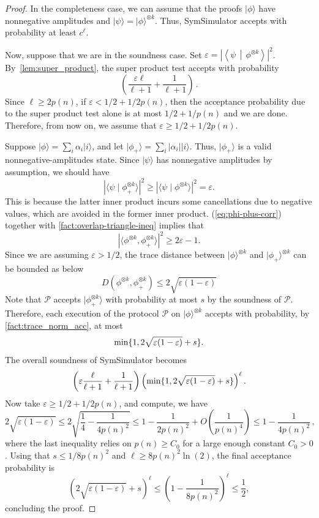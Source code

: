 \documentclass[10pt,a4paper]{article}
\theoremstyle{remark}
\def\epsilon{\varepsilon}
\def\cal{\mathcal}
\newcommand{\mper}{\,.}
\newcommand{\mcom}{\,,}
\newcommand{\abs}[1]{\ensuremath{\left\lvert #1 \right\rvert}}
\newcommand{\calP}{{\cal P}}
\newcommand{\1}[1]{\mathds{1}{[#1]}}
\newcommand{\ket}[1]{\lvert #1\rangle}
\newcommand{\braket}[2]{\left\langle #1 \,\middle\vert\, #2\right\rangle}
\DeclarePairedDelimiter\set{\lbrace}{\rbrace}
\numberwithin{equation}{section}
\begin{document}
\begin{proof}
  In the completeness case, we can assume that the proofs $\ket{\phi}$ have nonnegative amplitudes
  and $\ket{\psi} = \ket{\phi}^{\otimes k}$. Thus, SymSimulator accepts with probability at least $c^\ell$.

  Now, suppose that we are in the soundness case. Set $\epsilon =\abs{\braket{\psi}{\phi^{\otimes k}}}^2$.
  By~\cref{lem:super_product}, the super product test accepts with probability
    \[ 
  \left( \frac{ \epsilon\ell}{\ell+1} + \frac{1}{\ell+1} \right)\mper
    \] 
      Since $\ell \ge 2p(n)$, if $\epsilon < 1/2 + 1/2p(n)$, then the acceptance probability due to the super product test alone is at most $1/2+1/p(n)$
  and we are done. Therefore, from now on, we assume that $\epsilon \ge 1/2 + 1/2p(n)$. 
  
  Suppose $\ket{\phi} = \sum_i \alpha_i \ket{i}$, and let $\ket{\phi_+} = \sum_{i} \abs{\alpha_i} \ket{i}$. Thus, $\ket{\phi_+}$ is a valid nonnegative-amplitudes state.
  Since $\ket{\psi}$ has nonnegative amplitudes by assumption, we should have 
    \begin{equation}\label{eq:phi-plus-corr}
        |\langle \psi \mid \phi_+^{\otimes k} \rangle|^2 \ge |\langle \psi \mid \phi^{\otimes k} \rangle|^2 = \epsilon.
    \end{equation}
  This is because the latter inner product incurs some cancellations due to negative values, which are avoided in the former inner product. 
  (\ref{eq:phi-plus-corr}) together with \cref{fact:overlap-triangle-ineq} implies that  
    \begin{equation*}
        |\langle \phi^{\otimes k}, \phi_+^{\otimes k}\rangle|^2
            \ge 2\epsilon-1.
    \end{equation*}
  Since we are assuming $\epsilon > 1/2$, the trace distance between $\ket\phi ^{\otimes k}$ and $\ket{\phi_+}^{\otimes k}$ can be bounded as below
    \begin{equation}
        D(\phi^{\otimes k}, \phi_+^{\otimes k})\le 2\sqrt{\epsilon(1-\epsilon)}
    \end{equation}
  Note that $\calP$ accepts $|\phi_+^{\otimes k}\rangle$ with probability at most $s$ by the soundness of $\calP$.
  Therefore, each execution of the protocol $\calP$ on $\ket\phi ^{\otimes k}$ accepts with probability, by \cref{fact:trace_norm_acc}, at most 
  \[\min\set{1,2\sqrt{\epsilon(1-\epsilon)} + s}.\]
  The overall soundness of SymSimulator becomes
    \[ 
  \left(\epsilon \frac{\ell}{\ell+1} + \frac{1}{\ell+1} \right) \left( \min\set{1,2\sqrt{\epsilon(1-\epsilon)} + s} \right)^{\ell} .
    \] 
 Now take  $\epsilon \ge 1/2 + 1/2p(n)$, and compute, we have
    \[ 
  2\sqrt{\epsilon(1-\epsilon)} \le 2 \sqrt{\frac{1}{4} - \frac{1}{4 p(n)^2}} \le 1 - \frac{1}{2 p(n)^2} + O\left(\frac{1}{p(n)^4}\right) \le 1 - \frac{1}{4p(n)^2}\mcom
    \] 
  where the last inequality relies on $p(n) \ge C_0$ for a large enough constant $C_0 > 0$.
  Using that $s \le 1/8p(n)^2$ and $\ell  \ge 8 p(n)^2 \ln(2)$, the final acceptance probability is
    \[ 
  \left(2\sqrt{\epsilon(1-\epsilon)} + s \right)^{\ell} \le \left(1 - \frac{1}{8p(n)^2} \right)^\ell \le \frac{1}{2},
    \] 
  concluding the proof.
\end{proof}
\end{document}
